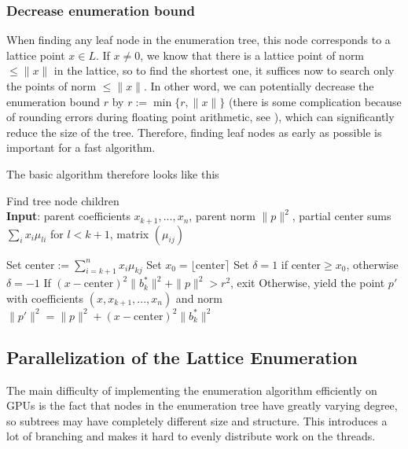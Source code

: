 \documentclass{scrartcl}
\begin{document}
    \subsubsection{Decrease enumeration bound}

    \label{sec:enum_bound}
    When finding any leaf node in the enumeration tree, this node corresponds to a lattice point $x \in L$. If $x \neq 0$, we know that there is a lattice point of norm $\leq \|x\|$ in the lattice, so to find the shortest one, it suffices now to search only the points of norm $\leq \|x\|$. In other word, we can potentially decrease the enumeration bound $r$ by $r := \min \{ r, \|x\| \}$ (there is some complication because of rounding errors during floating point arithmetic, see \cite{enum_numerics}), which can significantly reduce the size of the tree. Therefore, finding leaf nodes as early as possible is important for a fast algorithm.

    The basic algorithm therefore looks like this

    \begin{algorithm}[H]
        \caption{Find tree node children \label{alg:children_iter}\\\textbf{Input}: parent coefficients $x_{k + 1}, ..., x_n$, parent norm $\|p\|^2$, partial center sums $\sum_i x_i \mu_{li}$ for $l < k + 1$, matrix $(\mu_{ij})$}
        \begin{algorithmic}
            \STATE Set $\mathrm{center} := \sum_{i = k + 1}^n x_i \mu_{kj}$
            \STATE Set $x_0 = \lfloor \mathrm{center} \rceil$
            \STATE Set $\delta = 1$ if $\mathrm{center} \geq x_0$, otherwise $\delta = -1$
                \STATE If $(x - \mathrm{center})^2 \| b^*_k \|^2 + \| p \|^2 > r^2$, exit
                \STATE Otherwise, yield the point $p'$ with coefficients $(x, x_{k + 1}, ..., x_n)$ and norm $\|p'\|^2 = \|p\|^2 + (x - \mathrm{center})^2 \|b_k^*\|^2$
            \ENDFOR
        \end{algorithmic}
    \end{algorithm}

    \subsection{Parallelization of the Lattice Enumeration}

    The main difficulty of implementing the enumeration algorithm efficiently on GPUs is the fact that nodes in the enumeration tree have greatly varying degree, so subtrees may have completely different size and structure. This introduces a lot of branching and makes it hard to evenly distribute work on the threads.
\end{document}
